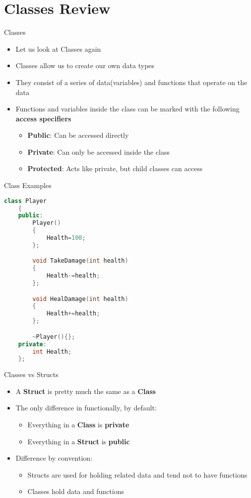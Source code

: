 \part{Classes Review}
\frame{\partpage}

\begin{frame}{Classes}
	\begin{itemize}
		\pause \item Let us look at Classes again
		\pause \item Classes allow us to create our own data types
		\pause \item They consist of a series of data(variables) and functions that operate on the data
		\pause \item Functions and variables inside the class can be marked with the following \textbf{access specifiers}
		\begin{itemize}
			\pause \item \textbf{Public}: Can be accessed directly
			\pause \item \textbf{Private}: Can only be accessed inside the class
			\pause \item \textbf{Protected}: Acts like private, but child classes can access
		\end{itemize}
	\end{itemize}
\end{frame}

\begin{frame}[fragile]{Class Examples}
	\begin{lstlisting}[language=C++,basicstyle=\tiny,]
	class Player
	{
	public:
		Player()
		{
			Health=100;
		};

		void TakeDamage(int health)
		{
			Health-=health;
		};

		void HealDamage(int health)
		{
			Health+=health;
		};

		~Player(){};
	private:
		int Health;
	};
\end{lstlisting}
\end{frame}


\begin{frame}{Classes vs Structs}
\begin{itemize}
	\pause \item A \textbf{Struct} is pretty much the same as a \textbf{Class}
	\pause \item The only difference in functionally, by default:
	\begin{itemize}
		\pause \item Everything in a \textbf{Class} is \textbf{private}
		\pause \item Everything in a \textbf{Struct} is \textbf{public}
	\end{itemize}
	\pause \item Difference by convention:
	\begin{itemize}
		\pause \item Structs are used for holding related data and tend not to have functions
		\pause \item Classes hold data and functions
	\end{itemize}
\end{itemize}
\end{frame}


